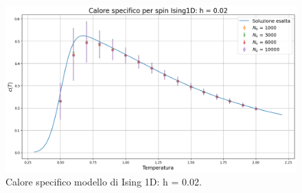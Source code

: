 \begin{figure}[H]
    \centering
    \includegraphics[width=\textwidth]{Immagini/simIsing1D/cp_h0.02.png}
    \caption{Calore specifico modello di Ising 1D: h = 0.02.}
    \label{fig: cp_Ising1D_h0.0}
\end{figure}